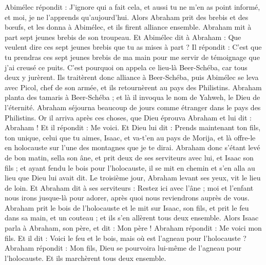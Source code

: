 \begin{multicols}{2}
Abimélec répondit : J'ignore qui a fait cela, et aussi tu ne m'en as point informé, et moi, je ne l'apprends qu'aujourd'hui.
Alors Abraham prit des brebis et des bœufs, et les donna à Abimélec, et ils firent alliance ensemble.
Abraham mit à part sept jeunes brebis de son troupeau.
Et Abimélec dit à Abraham : Que veulent dire ces sept jeunes brebis que tu as mises à part ?
Il répondit : C'est que tu prendras ces sept jeunes brebis de ma main pour me servir de témoignage que j'ai creusé ce puits.
C'est pourquoi on appela ce lieu-là Beer-Schéba, car tous deux y jurèrent.
Ils traitèrent donc alliance à Beer-Schéba, puis Abimélec se leva avec Picol, chef de son armée, et ils retournèrent au pays des Philistins.
Abraham planta des tamaris à Beer-Schéba ; et là il invoqua le nom de Yahweh, le Dieu de l'éternité.
Abraham séjourna beaucoup de jours comme étranger dans le pays des Philistins.
\VerseOne{}Or il arriva après ces choses, que Dieu éprouva Abraham et lui dit : Abraham ! Et il répondit : Me voici.
Et Dieu lui dit : Prends maintenant ton fils, ton unique, celui que tu aimes, Isaac, et va-t'en au pays de Morija, et là offre-le en holocauste sur l'une des montagnes que je te dirai.
Abraham donc s'étant levé de bon matin, sella son âne, et prit deux de ses serviteurs avec lui, et Isaac son fils ; et ayant fendu le bois pour l'holocauste, il se mit en chemin et s'en alla au lieu que Dieu lui avait dit.
Le troisième jour, Abraham levant ses yeux, vit le lieu de loin.
Et Abraham dit à ses serviteurs : Restez ici avec l'âne ; moi et l'enfant nous irons jusque-là pour adorer, après quoi nous reviendrons auprès de vous.
Abraham prit le bois de l'holocauste et le mit sur Isaac, son fils, et prit le feu dans sa main, et un couteau ; et ils s'en allèrent tous deux ensemble.
Alors Isaac parla à Abraham, son père, et dit : Mon père ! Abraham répondit : Me voici mon fils. Et il dit : Voici le feu et le bois, mais où est l'agneau pour l'holocauste ?
Abraham répondit : Mon fils, Dieu se pourvoira lui-même de l'agneau pour l'holocauste. Et ils marchèrent tous deux ensemble.

\end{multicols}
